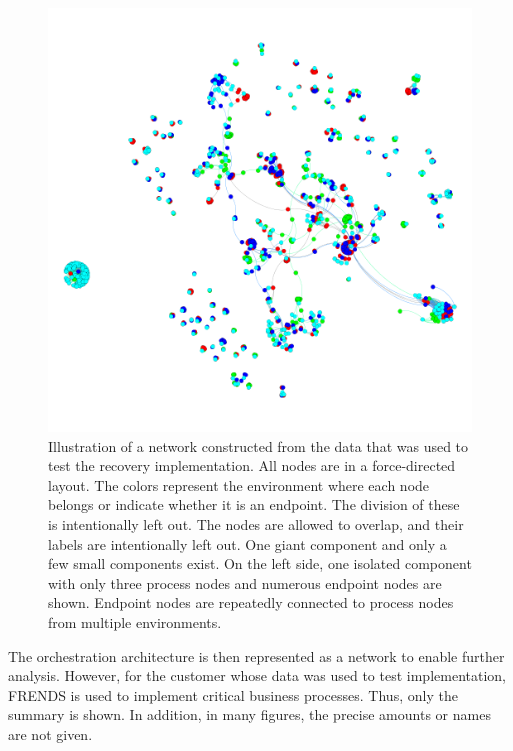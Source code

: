 \documentclass[english, 12pt, a4paper, sci, utf8, a-2b, online, obeyspaces]{aaltothesis}
\begin{document}
\begin{figure}[htb]
  \centering
  \includegraphics[width=\textwidth]{pictures/network/AllNodesEnvColor.png}
  \caption{Illustration of a network constructed from the data that was used to test the recovery implementation. All nodes are in a force-directed layout. The colors represent the environment where each node belongs or indicate whether it is an endpoint. The division of these is intentionally left out. The nodes are allowed to overlap, and their labels are intentionally left out. One giant component and only a few small components exist. On the left side, one isolated component with only three process nodes and numerous endpoint nodes are shown. Endpoint nodes are repeatedly connected to process nodes from multiple environments.}
  \label{fig:AllNodesEnvColor}
\end{figure}

The orchestration architecture is then represented as a network to enable further analysis. However, for the customer whose data was used to test implementation, FRENDS is used to implement critical business processes. Thus, only the summary is shown. In addition, in many figures, the precise amounts or names are not given.
\end{document}
